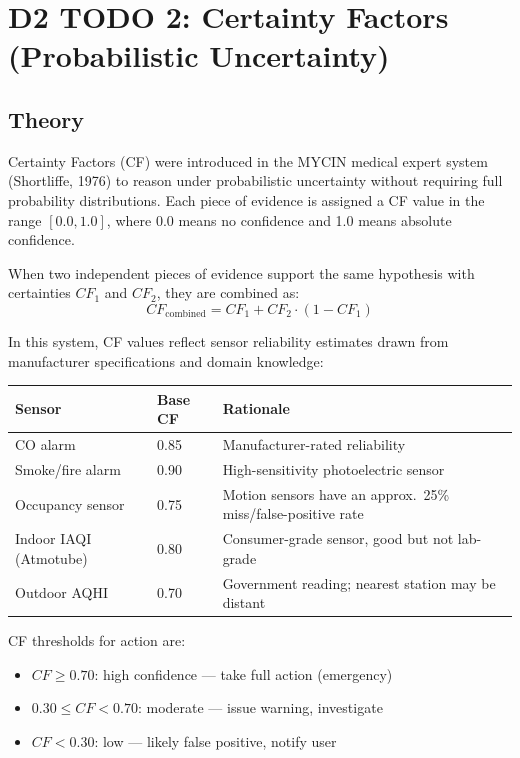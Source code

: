 \documentclass{article}
\begin{document}

\section{D2 TODO 2: Certainty Factors (Probabilistic Uncertainty)}

\subsection{Theory}

Certainty Factors (CF) were introduced in the MYCIN medical expert system (Shortliffe, 1976) to reason under probabilistic uncertainty without requiring full probability distributions. Each piece of evidence is assigned a CF value in the range $[0.0, 1.0]$, where 0.0 means no confidence and 1.0 means absolute confidence.

When two independent pieces of evidence support the same hypothesis with certainties $CF_1$ and $CF_2$, they are combined as:
\[
CF_{\text{combined}} = CF_1 + CF_2 \cdot (1 - CF_1)
\]

In this system, CF values reflect sensor reliability estimates drawn from manufacturer specifications and domain knowledge:

\begin{center}
\begin{tabular}{lll}
\hline
Sensor & Base CF & Rationale \\
\hline
CO alarm & 0.85 & Manufacturer-rated reliability \cite{co_detector_standard} \\
Smoke/fire alarm & 0.90 & High-sensitivity photoelectric sensor \\
Occupancy sensor & 0.75 & Motion sensors have an approx.\ 25\% miss/false-positive rate \\
Indoor IAQI (Atmotube) & 0.80 & Consumer-grade sensor, good but not lab-grade \\
Outdoor AQHI & 0.70 & Government reading; nearest station may be distant \\
\hline
\end{tabular}
\end{center}

CF thresholds for action are:
\begin{itemize}
    \item $CF \geq 0.70$: high confidence — take full action (emergency)
    \item $0.30 \leq CF < 0.70$: moderate — issue warning, investigate
    \item $CF < 0.30$: low — likely false positive, notify user
\end{itemize}
\end{document}
